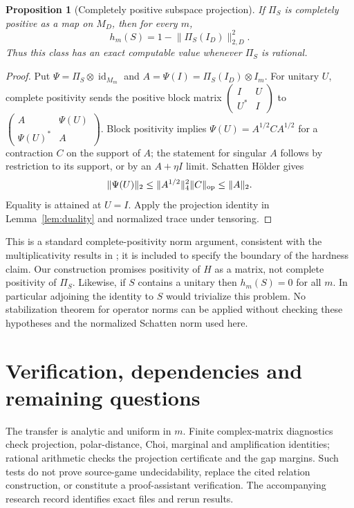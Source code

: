 \documentclass[11pt,a4paper]{article}
\newtheorem{proposition}[theorem]{Proposition}
\newcommand{\id}{\operatorname{id}}
\newcommand{\norm}[1]{\lVert#1\rVert}
\begin{document}
\begin{proposition}[Completely positive subspace projection]\label{prop:cp}
If $\Pi_S$ is completely positive as a map on $M_D$, then for every $m$,
\[
 h_m(S)=1-\norm{\Pi_S(I_D)}_{2,D}^2.
\]
Thus this class has an exact computable value whenever $\Pi_S$ is rational.
\end{proposition}
\begin{proof}
Put $\Psi=\Pi_S\otimes\id_{M_m}$ and $A=\Psi(I)=\Pi_S(I_D)\otimes I_m$.
For unitary $U$, complete positivity sends the positive block matrix
$\left(\begin{smallmatrix}I&U\\U^*&I\end{smallmatrix}\right)$ to
$\left(\begin{smallmatrix}A&\Psi(U)\\\Psi(U)^*&A\end{smallmatrix}\right)$.
Block positivity implies $\Psi(U)=A^{1/2}CA^{1/2}$ for a contraction $C$ on the support of $A$; the statement for singular $A$ follows by restriction to its support, or by an $A+\eta I$ limit. Schatten H\"older gives
\[
 \norm{\Psi(U)}_2
 \le\norm{A^{1/2}}_4^2\norm C_{\rm op}\le\norm A_2.
\]
Equality is attained at $U=I$. Apply the projection identity in Lemma~\ref{lem:duality} and normalized trace under tensoring.
\end{proof}

This is a standard complete-positivity norm argument, consistent with the multiplicativity results in \cite{djkr}; it is included to specify the boundary of the hardness claim. Our construction promises positivity of $H$ as a matrix, not complete positivity of $\Pi_S$. Likewise, if $S$ contains a unitary then $h_m(S)=0$ for all $m$. In particular adjoining the identity to $S$ would trivialize this problem. No stabilization theorem for operator norms can be applied without checking these hypotheses and the normalized Schatten norm used here.

\section{Verification, dependencies and remaining questions}
The transfer is analytic and uniform in $m$. Finite complex-matrix diagnostics check projection, polar-distance, Choi, marginal and amplification identities; rational arithmetic checks the projection certificate and the gap margins. Such tests do not prove source-game undecidability, replace the cited relation construction, or constitute a proof-assistant verification. The accompanying research record identifies exact files and rerun results.
\end{document}
